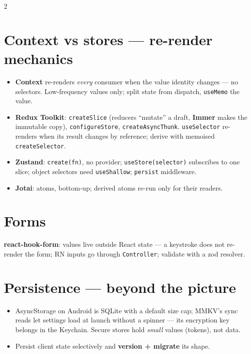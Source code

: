 \documentclass[8pt]{extarticle}
\begin{document}
\begin{multicols}{2}
\section{Context vs stores — re-render mechanics}
\begin{itemize}
  \item \textbf{Context} re-renders \emph{every} consumer when the value identity
        changes — no selectors. Low-frequency values only; split state from dispatch,
        \texttt{useMemo} the value.
  \item \textbf{Redux Toolkit}: \texttt{createSlice} (reducers ``mutate'' a draft,
        \textbf{Immer} makes the immutable copy), \texttt{configureStore},
        \texttt{createAsyncThunk}. \texttt{useSelector} re-renders when its result
        changes by reference; derive with memoised \texttt{createSelector}.
  \item \textbf{Zustand}: \texttt{create(fn)}, no provider; \texttt{useStore(selector)}
        subscribes to one slice; object selectors need \texttt{useShallow};
        \texttt{persist} middleware.
  \item \textbf{Jotai}: atoms, bottom-up; derived atoms re-run only for their readers.
\end{itemize}

\section{Forms}
\textbf{react-hook-form}: values live outside React state — a keystroke does not re-render
the form; RN inputs go through \texttt{Controller}; validate with a zod resolver.

\columnbreak

\section{Persistence — beyond the picture}
\begin{itemize}
  \item AsyncStorage on Android is SQLite with a default size cap\unverified; MMKV's sync reads
        let settings load at launch without a spinner — its encryption key belongs in
        the Keychain. Secure stores hold \emph{small} values (tokens), not data.
  \item Persist client state selectively and \textbf{version + migrate} its shape.
\end{itemize}


\end{multicols}
\end{document}
